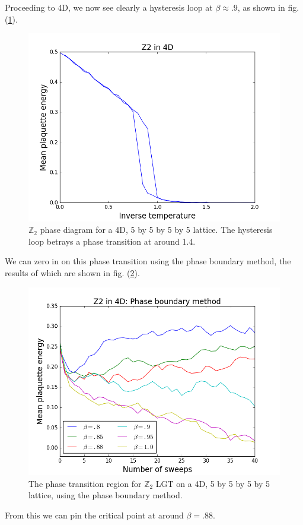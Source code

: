 \documentclass[9pt,twocolumn,twoside]{article}
\begin{document}
Proceeding to 4D, we now see clearly a hysteresis loop at $\beta \approx .9$, as shown in fig. (\ref{z2,4d}).
\begin{figure}[h!]
	\begin{centering}
	\includegraphics[width=\columnwidth]{z2,4d}
	\caption{$\mathbb{Z}_2$ phase diagram for a 4D, 5 by 5 by 5 by 5 lattice.  The hysteresis loop betrays a phase transition at around 1.4.}
	\label{z2,4d}
	\end{centering}
\end{figure}
We can zero in on this phase transition using the phase boundary method, the results of which are shown in fig. (\ref{z2,4d,phase}).
\begin{figure}[h!]
	\begin{centering}
	\includegraphics[width=\columnwidth]{z2,4d,phase}
	\caption{The phase transition region for $\mathbb{Z}_2$ LGT on a 4D, 5 by 5 by 5 by 5 lattice, using the phase boundary method.}
	\label{z2,4d,phase}
	\end{centering}
\end{figure}
From this we can pin the critical point at around $\beta= .88$. 
\end{document}
